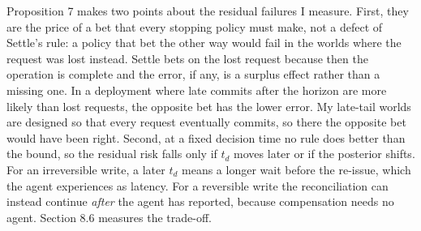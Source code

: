 \documentclass[
  10pt,
]{article}
\begin{document}
Proposition 7 makes two points about the residual failures I measure.
First, they are the price of a bet that every stopping policy must make,
not a defect of Settle's rule: a policy that bet the other way would
fail in the worlds where the request was lost instead. Settle bets on
the lost request because then the operation is complete and the error,
if any, is a surplus effect rather than a missing one. In a deployment
where late commits after the horizon are more likely than lost requests,
the opposite bet has the lower error. My late-tail worlds are designed
so that every request eventually commits, so there the opposite bet
would have been right. Second, at a fixed decision time no rule does
better than the bound, so the residual risk falls only if \(t_d\) moves
later or if the posterior shifts. For an irreversible write, a later
\(t_d\) means a longer wait before the re-issue, which the agent
experiences as latency. For a reversible write the reconciliation can
instead continue \emph{after} the agent has reported, because
compensation needs no agent. Section 8.6 measures the trade-off.
\end{document}
